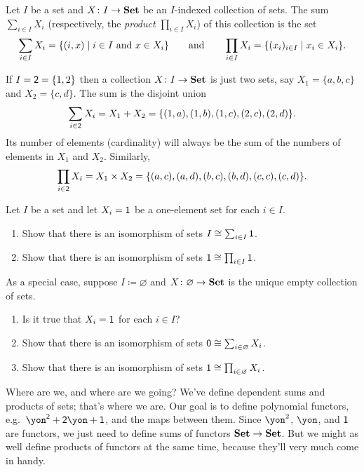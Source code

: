\documentclass[DynamicalBook]{subfiles}
\begin{document}
\begin{definition}
Let $I$ be a set and $X\colon I\to\textbf{Set}$ be an $I$-indexed collection of sets. The sum $\sum_{i\in I}X_i$ (respectively, the \emph{product} $\prod_{i\in I}X_i$) of this collection is the set
\[
\sum_{i\in I}X_i=\{(i,x)\mid i\in I\text{ and }x\in X_i\}
\qquad\text{and}\qquad
\prod_{i\in I}X_i=\{(x_i)_{i\in I}\mid x_i\in X_i\}.
\]
\end{definition}

\begin{example}\label{ex.two_sums_and_prods}
If $I=\textsf{2}=\{1,2\}$ then a collection $X\colon I\to \textbf{Set}$ is just two sets, say $X_1=\{a,b,c\}$ and $X_2=\{c,d\}$. The sum is the disjoint union
\[\sum_{i\in \textsf{2}}X_i=X_1+X_2=\{(1,a),(1,b),(1,c),(2,c),(2,d)\}.\]
Its number of elements (cardinality) will always be the sum of the numbers of elements in $X_1$ and $X_2$. Similarly,
\[\prod_{i\in \textsf{2}}X_i=X_1\times X_2=\{(a,c),(a,d),(b,c),(b,d),(c,c),(c,d)\}.\]
\end{example}


\begin{exercise}\label{exc.on_sums_prods_sets}
Let $I$ be a set and let $X_i=\textsf{1}$ be a one-element set for each $i\in I$. 
\begin{enumerate}
	\item Show that there is an isomorphism of sets $I\cong\sum_{i\in I}\textsf{1}$.
	\item Show that there is an isomorphism of sets $\textsf{1}\cong\prod_{i\in I}\textsf{1}$.
\end{enumerate}
As a special case, suppose $I\coloneqq\varnothing$ and $X\colon \varnothing\to\textbf{Set}$ is the unique empty collection of sets.
\begin{enumerate}
	\item Is it true that $X_i=\textsf{1}$ for each $i\in I$?
	\item Show that there is an isomorphism of sets $\textsf{0}\cong\sum_{i\in\varnothing}X_i$.
	\item Show that there is an isomorphism of sets $\textsf{1}\cong\prod_{i\in\varnothing}X_i$.
\qedhere
\end{enumerate}
\end{exercise}

Where are we, and where are we going? We've define dependent sums and products of sets; that's where we are. Our goal is to define polynomial functors, e.g.\ $\yon^\2+\2\yon+\1$, and the maps between them. Since $\yon^2$, $\yon$, and $\textsf{1}$ are functors, we just need to define sums of functors $\textbf{Set}\to\textbf{Set}$. But we might as well define products of functors at the same time, because they'll very much come in handy.
\end{document}
